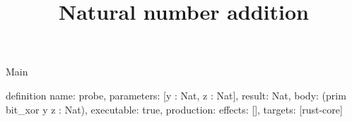 \begin{lexlean}{Main}
\title{Natural number addition}
\begin{semanticmodule}
definition{
  name: probe,
  parameters: [y : Nat, z : Nat],
  result: Nat,
  body: (prim bit_xor y z : Nat),
  executable: true,
  production: {effects: [], targets: [rust-core]}
}
\end{semanticmodule}
\end{lexlean}
